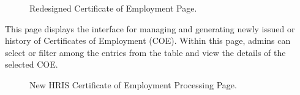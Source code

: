     \begin{figure}[H]
        \centering
        \caption{Redesigned Certificate of Employment Page.}
        \label{fig:app-coe}
    \end{figure}

    This page displays the interface for managing and generating newly issued or history of Certificates of Employment (COE). Within this page, admins can select or filter among the entries from the table and view the details of the selected COE. 

    \begin{figure}[H]
        \centering
        \caption{New HRIS Certificate of Employment Processing Page.}
        \label{fig:app-coe-info}
    \end{figure}

